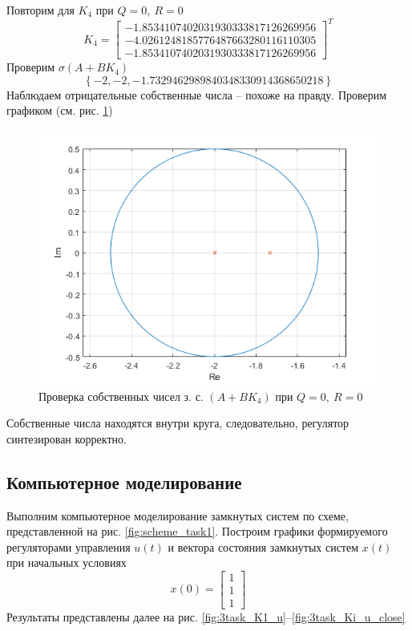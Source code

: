 \documentclass[a4paper, 12pt]{article}
\begin{document}
    Повторим для $K_4$ при $Q=0,\ R=0$
    $$
    K_4=\begin{bmatrix}
        -1.8534107402031930333817126269956\\-4.0261248185776487663280116110305\\-1.8534107402031930333817126269956
    \end{bmatrix}^T
    $$
    Проверим $\sigma\left( A+BK_4 \right)$
    $$
    \left\{ -2, -2, -1.7329462989840348330914368650218 \right\}
    $$
    Наблюдаем отрицательные собственные числа -- похоже на правду. Проверим графиком (см. рис. \ref{3task_eig_Q0_R0})
    \begin{figure}[H]
        \centering
        \includegraphics[scale=0.75]{3task_eig_Q0_R0.png}
        \captionsetup{skip=0pt}
        \caption{Проверка собственных чисел з. с. $\left(A+BK_4\right)$ при $Q=0,\ R=0$}
        \label{3task_eig_Q0_R0}
    \end{figure}
    \noindent Собственные числа находятся внутри круга, следовательно, регулятор синтезирован корректно.


    \subsection{Компьютерное моделирование}
    Выполним компьютерное моделирование замкнутых систем по схеме, представленной на рис. \ref{fig:scheme_task1}. Построим
    графики формируемого регуляторами управления $u(t)$ и вектора состояния замкнутых систем $x(t)$
    при начальных условиях $$x(0)=\begin{bmatrix}
        1\\1\\1
    \end{bmatrix}$$
    Результаты представлены далее на рис. \ref{fig:3task_K1_u}--\ref{fig:3task_Ki_u_close}
\end{document}
